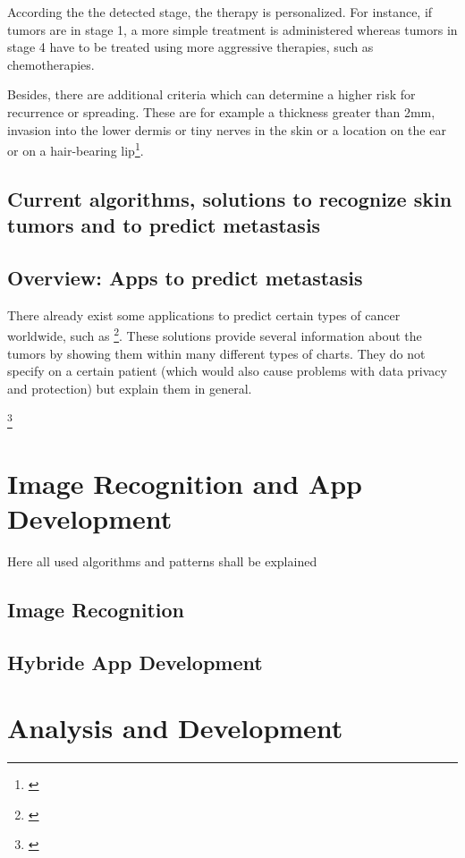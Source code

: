 According the the detected stage, the therapy is personalized. For instance, if tumors are in stage 1, a more simple treatment is administered whereas tumors in stage 4 have to be treated using more aggressive therapies, such as chemotherapies.   

Besides, there are additional criteria which can determine a higher risk for recurrence or spreading. These are for example a thickness greater than 2mm, invasion into the lower dermis or tiny nerves in the skin or a location on the ear or on a hair-bearing lip\footnote{\cite{skin_cancer_types}}.

\section{Current algorithms, solutions to recognize skin tumors and to predict metastasis}

\section{Overview: Apps to predict metastasis}

There already exist some applications to predict certain types of cancer worldwide, such as \footnote{\cite{iarc_predict_cancer_worldwide}}. These solutions provide several information about the tumors by showing them within many different types of charts. They do not specify on a certain patient (which would also cause problems with data privacy and protection) but explain them in general.  


\footnote{\cite{vijini_gen_alg}}


\chapter{Image Recognition and App Development}
Here all used algorithms and patterns shall be explained

\section{Image Recognition}
\section{Hybride App Development}


\chapter{Analysis and Development}

